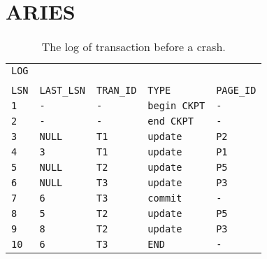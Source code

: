 \documentclass[12pt]{article}
\begin{document}
\section*{ARIES}
\begin{table}[h!]
\begin{tabular*}{\textwidth}{@{\extracolsep{\fill}}lllll} 
\texttt{LOG}&&&& \\ 
&&&&\\ 
\texttt{LSN} & \texttt{LAST\_LSN} & \texttt{TRAN\_ID} & \texttt{TYPE} & \texttt{PAGE\_ID} \\
\texttt{1} & \texttt{-} & \texttt{-} & \texttt{begin CKPT} & \texttt{-} \\ 
\texttt{2} & \texttt{-} & \texttt{-} & \texttt{end CKPT} & \texttt{-} \\ 
\texttt{3} & \texttt{NULL} & \texttt{T1} & \texttt{update} & \texttt{P2} \\ 
\texttt{4} & \texttt{3} &\texttt{T1} & \texttt{update} & \texttt{P1} \\ 
\texttt{5} & \texttt{NULL} & \texttt{T2} & \texttt{update} & \texttt{P5} \\ 
\texttt{6} & \texttt{NULL} & \texttt{T3} & \texttt{update} & \texttt{P3} \\ 
\texttt{7} & \texttt{6} & \texttt{T3} & \texttt{commit} & \texttt{-} \\ 
\texttt{8} & \texttt{5} & \texttt{T2} & \texttt{update} & \texttt{P5} \\
\texttt{9} & \texttt{8} & \texttt{T2} & \texttt{update} & \texttt{P3} \\
\texttt{10} & \texttt{6} & \texttt{T3} & \texttt{END} & \texttt{-} \\ 
\end{tabular*}
\caption{The log of transaction before a crash.}
\label{log}
\end{table} 
\end{document}
